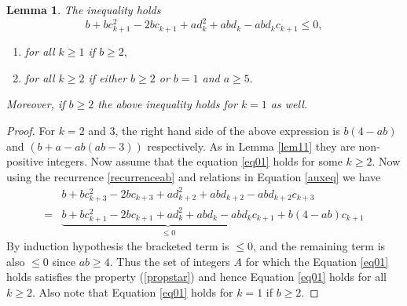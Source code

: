 \documentclass[12pt,reqno]{amsart}
\theoremstyle{plain}
\newtheorem{lem}{Lemma}
\theoremstyle{definition}
\theoremstyle{remark}
\begin{document}
\begin{lem}\label{lem12}
    The inequality holds
    \begin{equation}\label{eq01}
        b+bc_{k+1}^2-2bc_{k+1}+ad_k^2+abd_k-abd_kc_{k+1}\leq 0,
    \end{equation}
    \begin{enumerate}
        \item for all $k\geq 1$ if $b\geq 2,$
        \item for all $k\geq 2$ if either $b\geq 2$ or $b=1$ and $a\geq 5.$
    \end{enumerate}
    Moreover, if $b\geq 2$ the above inequality holds for $k=1$ as well.
\end{lem}
\begin{proof}
    For $k=2$ and $3$, the right hand side of the above expression is $b(4-ab)$ and 
    $(b+a-ab(ab-3))$ respectively. As in Lemma \ref{lem11} they are non-positive integers. Now assume that the equation \ref{eq01} holds for some $k\geq 2$. Now using the recurrence \ref{recurrenceab} and relations in Equation \ref{auxeq} we have 
    \begin{align*}
    &        b+bc_{k+3}^2-2bc_{k+3}+ad_{k+2}^2+abd_{k+2}-abd_{k+2}c_{k+3}\\=&\underbrace{        b+bc_{k+1}^2-2bc_{k+1}+ad_k^2+abd_k-abd_kc_{k+1}}_{\leq 0}+b(4-ab)c_{k+1}
    \end{align*}
    By induction hypothesis the bracketed term is $\le 0$, and the remaining term is also $\le 0$ since $ab\geq 4$.  Thus the set of integers $A$ for which the Equation \ref{eq01} holds satisfies the property (\ref{propstar}) and hence Equation \ref{eq01} holds for all $k\geq 2.$ Also note that Equation  \ref{eq01} holds for $k=1$ if $b\geq 2$.
    
\end{proof}

\end{document}
